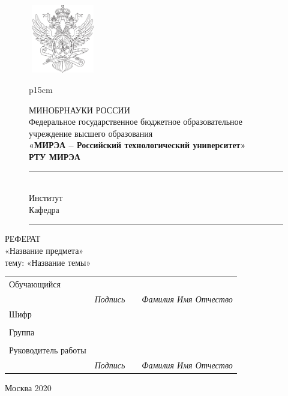\begin{center} 
    \begin{figure}[h]
        \centering
        \includegraphics[width=30mm, height=30mm]{inc/img/Gerb.png}
        \label{fig:Gerb}
        \begin{tabular}{p{15cm}}
            \begin{center}
                \small{МИНОБРНАУКИ РОССИИ}\\
                \small{Федеральное государственное бюджетное образовательное учреждение высшего образования}\\
                \textbf{«МИРЭА – Российский технологический университет»}\\
                \textbf{РТУ МИРЭА}\\
                \rule{\linewidth}{1pt}\\[-0.25cm]
                \small{Институт }\\
                \small{Кафедра }\\[-0.45cm]
                \rule{\linewidth}{.1pt}
            \end{center}
        \end{tabular}
    \end{figure}
    
\Large РЕФЕРАТ \\[4pt] %
 «Название предмета»\\[4pt]
 тему: «Название темы»
\end{center}
\vspace{8pt}
\large{\begin{center}
    \begin{tabular}{p{4.99cm}p{4cm}p{.01cm}p{4cm}}
    Обучающийся & & & \\ 
        \cline{2-2}\cline{4-4}
    & \multicolumn{1}{c}{\small{\textit{Подпись}}} & & \multicolumn{1}{c}{\small{\textit{Фамилия Имя Отчество}}} \\
    Шифр & \multicolumn{3}{l}{}\\\cline{2-2}
     & & & \\
    Группа & \multicolumn{3}{l}{}\\\cline{2-2}
     & & & \\
    Руководитель работы & & & \\ 
        \cline{2-2}\cline{4-4}
    & \multicolumn{1}{c}{\small{\textit{Подпись}}} & & \multicolumn{1}{c}{\small{\textit{Фамилия Имя Отчество}}} \\
    \end{tabular}
\end{center}}
\vfill
\begin{center} 
\large Москва 2020
\end{center} 

\thispagestyle{empty}